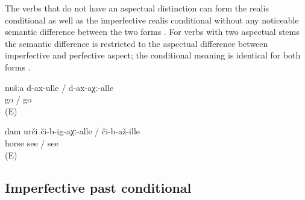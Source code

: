 The verbs that do not have an aspectual distinction can form the realis conditional as well as the imperfective realis conditional without any noticeable semantic difference between the two forms . For verbs with two aspectual stems the semantic difference is restricted to the aspectual difference between imperfective and perfective aspect; the conditional meaning is identical for both forms .
%
\begin{exe}
	\ex	\label{ex:‎‎‎if we go (E)}
	\gll	nušːa	d-ax-ulle /		d-ax-aχː-alle\\
			go	/ go\\
	\glt	{} (E)

	\ex	\label{ex:‎ if I see the horse (regularly / once) (E)}
	\gll	dam	urči	či-b-ig-aχː-alle	\quad/	či-b-až-ille\\
			horse	see	\quad/ see\\
	\glt	{} (E)
\end{exe}



\subsection{Imperfective past conditional}
\label{sec:imperfectivepastconditional}


